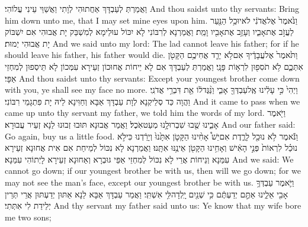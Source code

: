 {וַאֲמַרְתְּ לְעַבְדָּךְ אַחֲתוּהִי לְוָתִי וַאֲשַׁוֵּי עֵינִי עֲלוֹהִי׃}
{And thou saidst unto thy servants: Bring him down unto me, that I may set mine eyes upon him.}{}
{וַנֹּ֙אמֶר֙ אֶל\maqqaf אֲדֹנִ֔י לֹא\maqqaf יוּכַ֥ל הַנַּ֖עַר לַעֲזֹ֣ב אֶת\maqqaf אָבִ֑יו וְעָזַ֥ב אֶת\maqqaf אָבִ֖יו וָמֵֽת׃}
{וַאֲמַרְנָא לְרִבּוֹנִי לָא יִכּוֹל עוּלֵימָא לְמִשְׁבַּק יָת אֲבוּהִי אִם יִשְׁבּוֹק יָת אֲבוּהִי יְמוּת׃}
{And we said unto my lord: The lad cannot leave his father; for if he should leave his father, his father would die.}{}
{וַתֹּ֙אמֶר֙ אֶל\maqqaf עֲבָדֶ֔יךָ אִם\maqqaf לֹ֥א יֵרֵ֛ד אֲחִיכֶ֥ם הַקָּטֹ֖ן אִתְּכֶ֑ם לֹ֥א תֹסִפ֖וּן לִרְא֥וֹת פָּנָֽי׃}
{וַאֲמַרְתְּ לְעַבְדָּךְ אִם לָא יֵיחוֹת אֲחוּכוֹן זְעֵירָא עִמְּכוֹן לָא תֵּיסְפוּן לְמִחְזֵי אַפָּי׃}
{And thou saidst unto thy servants: Except your youngest brother come down with you, ye shall see my face no more.}{}
{וַיְהִי֙ כִּ֣י עָלִ֔ינוּ אֶֽל\maqqaf עַבְדְּךָ֖ אָבִ֑י וַנַּ֨גֶּד\maqqaf ל֔וֹ אֵ֖ת דִּבְרֵ֥י אֲדֹנִֽי׃}
{וַהֲוָה כַּד סְלֵיקְנָא לְוָת עַבְדָּךְ אַבָּא וְחַוִּינָא לֵיהּ יָת פִּתְגָמֵי רִבּוֹנִי׃}
{And it came to pass when we came up unto thy servant my father, we told him the words of my lord.}{}
{וַיֹּ֖אמֶר אָבִ֑ינוּ שֻׁ֖בוּ שִׁבְרוּ\maqqaf לָ֥נוּ מְעַט\maqqaf אֹֽכֶל׃}
{וַאֲמַר אֲבוּנָא תּוּבוּ זְבוּנוּ לַנָא זְעֵיר עֲבוּרָא׃}
{And our father said: Go again, buy us a little food.}{}
{וַנֹּ֕אמֶר לֹ֥א נוּכַ֖ל לָרֶ֑דֶת אִם\maqqaf יֵשׁ֩ אָחִ֨ינוּ הַקָּטֹ֤ן אִתָּ֙נוּ֙ וְיָרַ֔דְנוּ כִּי\maqqaf לֹ֣א נוּכַ֗ל לִרְאוֹת֙ פְּנֵ֣י הָאִ֔ישׁ וְאָחִ֥ינוּ הַקָּטֹ֖ן אֵינֶ֥נּוּ אִתָּֽנוּ׃}
{וַאֲמַרְנָא לָא נִכּוֹל לְמֵיחַת אִם אִית אֲחוּנָא זְעֵירָא עִמַּנָא וְנֵיחוֹת אֲרֵי לָא נִכּוֹל לְמִחְזֵי אַפֵּי גּוּבְרָא וְאַחוּנָא זְעֵירָא לָיְתוֹהִי עִמַּנָא׃}
{And we said: We cannot go down; if our youngest brother be with us, then will we go down; for we may not see the man’s face, except our youngest brother be with us.}{}
{וַיֹּ֛אמֶר עַבְדְּךָ֥ אָבִ֖י אֵלֵ֑ינוּ אַתֶּ֣ם יְדַעְתֶּ֔ם כִּ֥י שְׁנַ֖יִם יָֽלְדָה\maqqaf לִּ֥י אִשְׁתִּֽי׃}
{וַאֲמַר עַבְדָּךְ אַבָּא לַנָא אַתּוּן יְדַעְתּוּן אֲרֵי תְּרֵין יְלֵידַת לִי אִתְּתִי׃}
{And thy servant my father said unto us: Ye know that my wife bore me two sons;}{}
